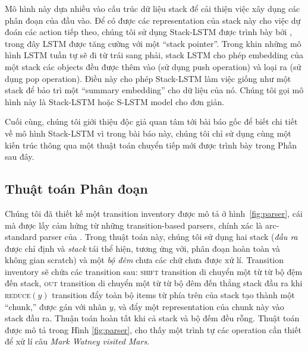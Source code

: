 \documentclass[11pt,letterpaper]{article}
\begin{document}
Mô hình này dựa nhiều vào cấu trúc dữ liệu stack để cải thiện việc xây dụng các phân đoạn của đầu vào. Để có được các representation của stack này cho việc dự đoán các action tiếp theo, chúng tôi sử dụng Stack-LSTM được trình bày bởi , trong đây LSTM được tăng cường với một ``stack pointer''. Trong khin những mô hình LSTM tuần tự sẽ đi từ trái sang phải, stack LSTM cho phép embedding của một stack các objects đều được thêm vào (sử dụng push operation) và loại ra (sử dụng pop operation). Điều này cho phép Stack-LSTM làm việc giống như một stack để bảo trì một ``summary embedding'' cho dữ liệu của nó. Chúng tôi gọi mô hình này là Stack-LSTM hoặc S-LSTM model cho đơn giản. 

Cuối cùng, chúng tôi giới thiệu độc giả quan tâm tới bài báo gốc \cite{dyer:2015} để biết chi tiết về mô hình Stack-LSTM vì trong bài báo này, chúng tôi chỉ sử dụng cùng một kiến trúc thông qua một thuật toán chuyển tiếp mới được trình bày trong Phần sau đây.

\subsection{Thuật toán Phân đoạn}

Chúng tôi đã thiết kế một transition inventory được mô tả ở hình~\ref{fig:parser}, cái mà được lấy cảm hứng từ những transition-based parsers, chính xác là arc-standard parser của . Trong thuật toán này, chúng tôi sử dụng hai stack (\emph{đầu ra} được chỉ định và \emph{stack} tái thể hiện, tương ứng với, phân đoạn hoàn toàn và không gian scratch) và một \emph{bộ đêm} chưa các chữ chưa được xử lí. Transition inventory sẽ chứa các transition sau: \textsc{shift} transition di chuyển một từ từ bộ đệm đến stack, \textsc{out} transition di chuyển một từ từ bộ đêm đến thẳng stack đầu ra khi \textsc{reduce}$(y)$ transition đẩy toàn bộ items từ phía trên của stack tạo thành một  ``chunk,'' được gán với nhãn $y$, và đẩy một representation của chunk này vào stack đầu ra. Thuận toán hoàn tất khi cả stack và bộ đếm đều rỗng. Thuật toán được mô tả trong Hình \ref{fig:parser}, cho thấy một trình tự các operation cần thiết để xử lí câu \emph{Mark Watney visited Mars}. 
\end{document}
